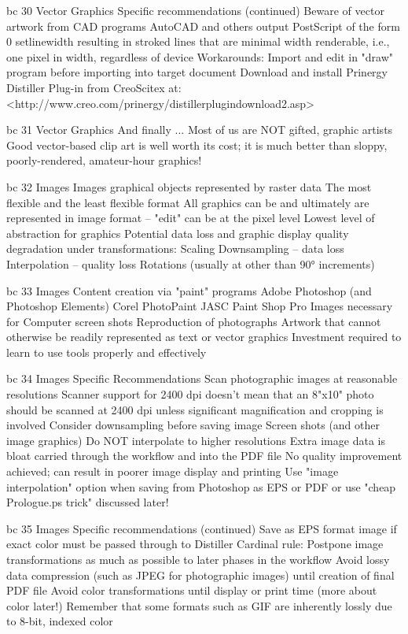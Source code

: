 \documentclass[11pt,a4paper]{article}
\begin{document}
bc 30 Vector Graphics Specific recommendations (continued) Beware of vector artwork from CAD programs AutoCAD and others output PostScript of the form 0 setlinewidth resulting in stroked lines that are minimal width renderable, i.e., one pixel in width, regardless of device Workarounds: Import and edit in "draw" program before importing into target document Download and install Prinergy Distiller Plug-in from CreoScitex at: <http://www.creo.com/prinergy/distillerplugindownload2.asp>

bc 31 Vector Graphics And finally ... Most of us are NOT gifted, graphic artists Good vector-based clip art is well worth its cost; it is much better than sloppy, poorly-rendered, amateur-hour graphics!

bc 32 Images Images graphical objects represented by raster data The most flexible and the least flexible format All graphics can be and ultimately are represented in image format -- "edit" can be at the pixel level Lowest level of abstraction for graphics Potential data loss and graphic display quality degradation under transformations: Scaling Downsampling -- data loss Interpolation -- quality loss Rotations (usually at other than 90° increments)

bc 33 Images Content creation via "paint" programs Adobe Photoshop (and Photoshop Elements) Corel PhotoPaint JASC Paint Shop Pro Images necessary for Computer screen shots Reproduction of photographs Artwork that cannot otherwise be readily represented as text or vector graphics Investment required to learn to use tools properly and effectively

bc 34 Images Specific Recommendations Scan photographic images at reasonable resolutions Scanner support for 2400 dpi doesn't mean that an 8"x10" photo should be scanned at 2400 dpi unless significant magnification and cropping is involved Consider downsampling before saving image Screen shots (and other image graphics) Do NOT interpolate to higher resolutions Extra image data is bloat carried through the workflow and into the PDF file No quality improvement achieved; can result in poorer image display and printing Use "image interpolation" option when saving from Photoshop as EPS or PDF or use "cheap Prologue.ps trick" discussed later!

bc 35 Images Specific recommendations (continued) Save as EPS format image if exact color must be passed through to Distiller Cardinal rule: Postpone image transformations as much as possible to later phases in the workflow Avoid lossy data compression (such as JPEG for photographic images) until creation of final PDF file Avoid color transformations until display or print time (more about color later!) Remember that some formats such as GIF are inherently lossly due to 8-bit, indexed color
\end{document}
